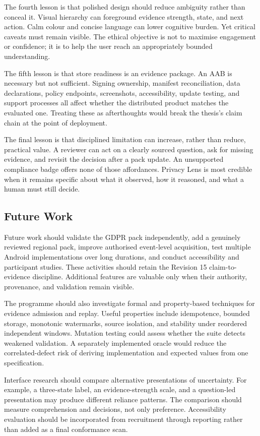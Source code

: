 The fourth lesson is that polished design should reduce ambiguity rather than conceal it. Visual hierarchy can foreground evidence strength, state, and next action. Calm colour and concise language can lower cognitive burden. Yet critical caveats must remain visible. The ethical objective is not to maximise engagement or confidence; it is to help the user reach an appropriately bounded understanding.

The fifth lesson is that store readiness is an evidence package. An AAB is necessary but not sufficient. Signing ownership, manifest reconciliation, data declarations, policy endpoints, screenshots, accessibility, update testing, and support processes all affect whether the distributed product matches the evaluated one. Treating these as afterthoughts would break the thesis's claim chain at the point of deployment.

The final lesson is that disciplined limitation can increase, rather than reduce, practical value. A reviewer can act on a clearly sourced question, ask for missing evidence, and revisit the decision after a pack update. An unsupported compliance badge offers none of those affordances. Privacy Lens is most credible when it remains specific about what it observed, how it reasoned, and what a human must still decide.

\subsection{Future Work}

Future work should validate the GDPR pack independently, add a genuinely reviewed regional pack, improve authorised event-level acquisition, test multiple Android implementations over long durations, and conduct accessibility and participant studies. These activities should retain the Revision 15 claim-to-evidence discipline. Additional features are valuable only when their authority, provenance, and validation remain visible.

The programme should also investigate formal and property-based techniques for evidence admission and replay. Useful properties include idempotence, bounded storage, monotonic watermarks, source isolation, and stability under reordered independent windows. Mutation testing could assess whether the suite detects weakened validation. A separately implemented oracle would reduce the correlated-defect risk of deriving implementation and expected values from one specification.

Interface research should compare alternative presentations of uncertainty. For example, a three-state label, an evidence-strength scale, and a question-led presentation may produce different reliance patterns. The comparison should measure comprehension and decisions, not only preference. Accessibility evaluation should be incorporated from recruitment through reporting rather than added as a final conformance scan.

